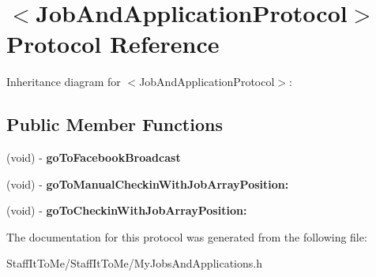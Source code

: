 \hypertarget{protocol_job_and_application_protocol-p}{
\section{$<$\-Job\-And\-Application\-Protocol$>$ \-Protocol \-Reference}
\label{protocol_job_and_application_protocol-p}
}


\-Inheritance diagram for $<$\-Job\-And\-Application\-Protocol$>$\-:
\subsection*{\-Public \-Member \-Functions}
\begin{DoxyCompactItemize}
\item 
\hypertarget{protocol_job_and_application_protocol-p_a3aa6c51a9f6bcd2592675f35f4cfd491}{
(void) -\/ {\bfseries go\-To\-Facebook\-Broadcast}}
\label{protocol_job_and_application_protocol-p_a3aa6c51a9f6bcd2592675f35f4cfd491}

\item 
\hypertarget{protocol_job_and_application_protocol-p_af97c18c193bfc50f62d0024794a712d0}{
(void) -\/ {\bfseries go\-To\-Manual\-Checkin\-With\-Job\-Array\-Position\-:}}
\label{protocol_job_and_application_protocol-p_af97c18c193bfc50f62d0024794a712d0}

\item 
\hypertarget{protocol_job_and_application_protocol-p_a21aca906018a392ca61c9fcbfa4bd5ee}{
(void) -\/ {\bfseries go\-To\-Checkin\-With\-Job\-Array\-Position\-:}}
\label{protocol_job_and_application_protocol-p_a21aca906018a392ca61c9fcbfa4bd5ee}

\end{DoxyCompactItemize}


\-The documentation for this protocol was generated from the following file\-:\begin{DoxyCompactItemize}
\item 
\-Staff\-It\-To\-Me/\-Staff\-It\-To\-Me/\-My\-Jobs\-And\-Applications.\-h\end{DoxyCompactItemize}
